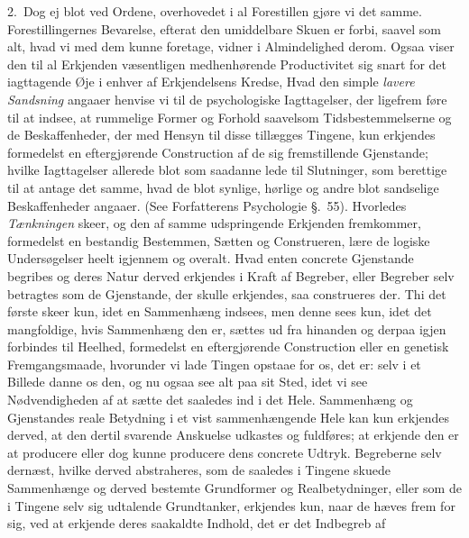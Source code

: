 \documentclass[12pt,a4paper]{book}
\newcommand{\apage}[1]{\marginnote{\footnotesize\textit{[#1]}}}
\begin{document}
2.~Dog ej blot ved Ordene, overhovedet i al Forestillen gjøre vi det samme.
Forestillingernes Bevarelse, efterat den umiddelbare Skuen er forbi, saavel som
alt, hvad vi med dem kunne foretage, vidner i Almindelighed derom. Ogsaa viser
den til al Erkjenden væsentligen medhenhørende Productivitet sig snart for det
iagttagende Øje i enhver af Erkjendelsens Kredse, Hvad den simple \emph{lavere
Sandsning} angaaer henvise vi til de psychologiske Iagttagelser, der ligefrem
føre til at indsee, at rummelige Former og Forhold saavelsom Tidsbestemmelserne
og de Beskaffenheder, der med Hensyn til disse tillægges Tingene, kun erkjendes
formedelst en eftergjørende Construction af de sig fremstillende Gjenstande;
hvilke Iagttagelser allerede blot som saadanne lede til Slutninger, som
berettige til at antage det samme, hvad de blot synlige, hørlige og andre blot
sandselige Beskaffenheder angaaer. (See Forfatterens Psychologie §.~55).
Hvorledes \emph{Tænkningen} skeer, og den af samme udspringende Erkjenden
fremkommer, formedelst en bestandig Bestemmen, Sætten og Construeren, lære de
logiske Undersøgelser heelt igjennem og overalt. Hvad enten concrete Gjenstande
begribes og deres Natur derved erkjendes i Kraft af Begreber, eller  \apage{22} Begreber
selv betragtes som de Gjenstande, der skulle erkjendes, saa construeres der. Thi
det første skeer kun, idet en Sammenhæng indsees, men denne sees kun, idet det
mangfoldige, hvis Sammenhæng den er, sættes ud fra hinanden og derpaa igjen
forbindes til Heelhed, formedelst en eftergjørende Construction eller en genetisk
Fremgangsmaade, hvorunder vi lade Tingen opstaae for os, det er: selv i et
Billede danne os den, og nu ogsaa see alt paa sit Sted, idet vi see
Nødvendigheden af at sætte det saaledes ind i det Hele. Sammenhæng og
Gjenstandes reale Betydning i et vist sammenhængende Hele kan kun erkjendes
derved, at den dertil svarende Anskuelse udkastes og fuldføres; at erkjende den
er at producere eller dog kunne producere dens concrete Udtryk. Begreberne selv
dernæst, hvilke derved abstraheres, som de saaledes i Tingene skuede
Sammenhænge og derved bestemte Grundformer og Realbetydninger, eller som de i
Tingene selv sig udtalende Grundtanker, erkjendes kun, naar de hæves frem for
sig, ved at erkjende deres saakaldte Indhold, det er det Indbegreb af
\end{document}
